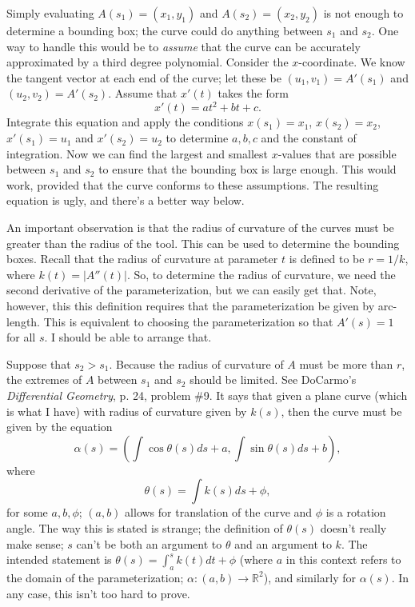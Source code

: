 \documentclass[titlepage,oneside,10pt]{article}
\begin{document}
Simply evaluating $A(s_1)=(x_1,y_1)$ and $A(s_2)=(x_2,y_2)$ is not
enough to determine a bounding box; the curve could do anything
between $s_1$ and $s_2$. One way to handle this would be to
\emph{assume} that the curve can be accurately approximated by a
third degree polynomial. Consider the $x$-coordinate. We know
the tangent vector at each end of the curve; let these be 
$(u_1,v_1) = A'(s_1)$ and $(u_2,v_2)=A'(s_2)$. Assume that $x'(t)$
takes the form  
$$x'(t) = at^2+bt+c.$$
Integrate this equation and apply the conditions $x(s_1)=x_1$,
$x(s_2)=x_2$, $x'(s_1)=u_1$ and $x'(s_2)=u_2$ to determine $a,b,c$ and
the constant of integration. Now we can find the largest and smallest
$x$-values that are possible between $s_1$ and $s_2$ to ensure that
the bounding box is large enough. This would work, provided that the curve
conforms to these assumptions. The resulting equation is ugly,
and there's a better way below.

An important observation is that the radius of curvature of the curves
must be greater than the radius of the tool. This can be used to
determine the bounding boxes. Recall that the radius of curvature at
parameter $t$ is defined to be $r = 1/k$, where $k(t)=|A''(t)|$. So,
to determine the radius of curvature, we need the second derivative of
the parameterization, but we can easily get that. Note, however, this
this definition requires that the parameterization be given by
arc-length. This is equivalent to choosing the parameterization so
that $A'(s)=1$ for all $s$. I should be able to arrange that.

Suppose that $s_2>s_1$. Because the radius of curvature of
$A$ must be more than $r$, the extremes of $A$ between $s_1$ and $s_2$
should be limited. See DoCarmo's \emph{Differential Geometry}, p. 24,
problem \#9. It says that given a plane curve (which is what I have)
with radius of curvature given by $k(s)$, then the curve must be given
by the equation
$$\alpha(s) = \left(\int\cos\theta(s) ds + a,\int\sin\theta(s)ds + b\right),$$
where
$$\theta(s) = \int k(s) ds +\phi,$$
for some $a,b,\phi$; $(a,b)$ allows for translation of the curve and
$\phi$ is a rotation angle. The way this is stated is strange; the
definition of $\theta(s)$ doesn't really make sense; $s$ can't be both
an argument to $\theta$ and an argument to $k$. The intended statement
is $\theta(s) = \int_a^s k(t) dt+\phi$ (where $a$ in this context
refers to the domain of the parameterization; $\alpha:(a,b)\rightarrow
{\mathbb R}^2$), and similarly for $\alpha(s)$. In
any case, this isn't too hard to prove.  
\end{document}
